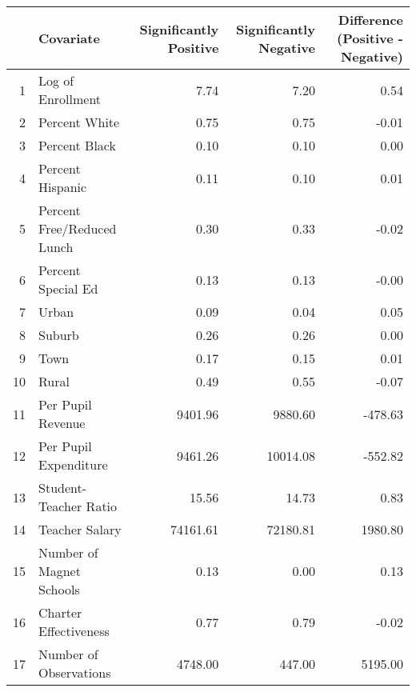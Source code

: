 \begin{tabular}{rlrrr}
  \hline
 & Covariate & Significantly Positive & Significantly Negative & Difference (Positive - Negative) \\ 
  \hline
1 & Log of Enrollment & 7.74 & 7.20 & 0.54 \\ 
  2 & Percent White & 0.75 & 0.75 & -0.01 \\ 
  3 & Percent Black & 0.10 & 0.10 & 0.00 \\ 
  4 & Percent Hispanic & 0.11 & 0.10 & 0.01 \\ 
  5 & Percent Free/Reduced Lunch & 0.30 & 0.33 & -0.02 \\ 
  6 & Percent Special Ed & 0.13 & 0.13 & -0.00 \\ 
  7 & Urban & 0.09 & 0.04 & 0.05 \\ 
  8 & Suburb & 0.26 & 0.26 & 0.00 \\ 
  9 & Town & 0.17 & 0.15 & 0.01 \\ 
  10 & Rural & 0.49 & 0.55 & -0.07 \\ 
  11 & Per Pupil Revenue & 9401.96 & 9880.60 & -478.63 \\ 
  12 & Per Pupil Expenditure & 9461.26 & 10014.08 & -552.82 \\ 
  13 & Student-Teacher Ratio & 15.56 & 14.73 & 0.83 \\ 
  14 & Teacher Salary & 74161.61 & 72180.81 & 1980.80 \\ 
  15 & Number of Magnet Schools & 0.13 & 0.00 & 0.13 \\ 
  16 & Charter Effectiveness & 0.77 & 0.79 & -0.02 \\ 
  17 & Number of Observations & 4748.00 & 447.00 & 5195.00 \\ 
   \hline
\end{tabular}

